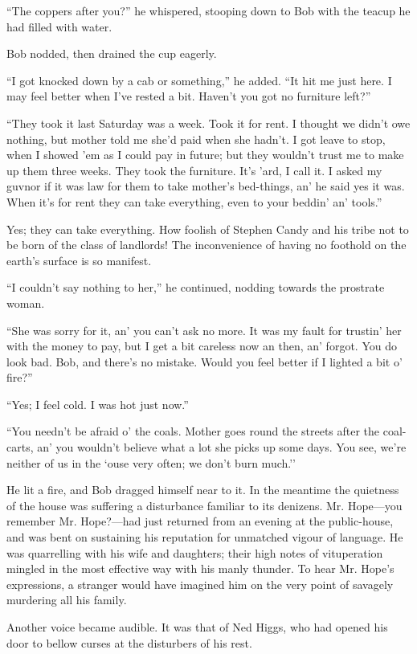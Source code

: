 ``The coppers after you?'' he whispered, stooping down to Bob with the
teacup he had filled with water.

Bob nodded, then drained the cup eagerly.

``I got knocked down by a cab or something,'' he added. ``It hit me just
here. I may feel better when I've rested a bit. Haven't you got no
furniture left?''

``They took it last Saturday was a week. Took it for rent. I thought we
didn't owe nothing, but mother told me she'd paid when she hadn't. I got
leave to stop, when I showed 'em as I could pay in future; but they
wouldn't trust me to make up them three weeks. They took the furniture.
It's 'ard, I call it. I asked my guvnor if it was law for them to take
mother's bed-things, an' he said yes it was. When it's for rent they can
take everything, even to your beddin' an' tools.''

Yes; they can take everything. How foolish of Stephen Candy and his
tribe not to be born of the class of landlords! The inconvenience of
having no foothold on the earth's surface is so manifest.

{}``I couldn't say nothing to her,'' he continued, nodding towards the
prostrate woman.

``She was sorry for it, an' you can't ask no more. It was my fault for
trustin' her with the money to pay, but I get a bit careless now an
then, an' forgot. You do look bad. Bob, and there's no mistake. Would
you feel better if I lighted a bit o' fire?''

``Yes; I feel cold. I was hot just now.''

``You needn't be afraid o' the coals. Mother goes round the streets
after the coal-carts, an' you wouldn't believe what a lot she picks up
some days. You see, we're neither of us in the `ouse very often; we
don't burn much.''

He lit a fire, and Bob dragged himself near to it. In the meantime the
quietness of the house was suffering a disturbance familiar to its
denizens. Mr. Hope---you remember Mr. Hope?---had just returned from an
evening at the public-house, and was bent on sustaining his reputation
for unmatched vigour of language. He was quarrelling with his wife and
daughters; their high notes of vituperation mingled in the most
effective way with his manly thunder. To hear Mr. Hope's expressions, a
stranger would have imagined him on {}the very point of savagely
murdering all his family.

Another voice became audible. It was that of Ned Higgs, who had opened
his door to bellow curses at the disturbers of his rest.

